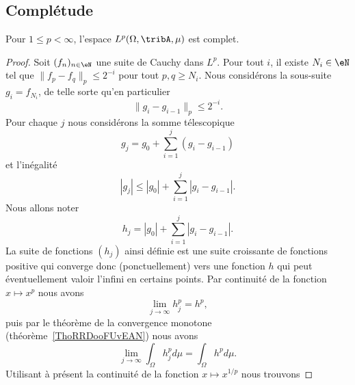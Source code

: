 \subsection{Complétude}

\begin{theorem}  \label{ThoUYBDWQX}
	Pour \( 1\leq p<\infty\), l'espace \( L^p(\Omega,\tribA,\mu)\) est complet.
\end{theorem}

\begin{proof}
	Soit \( (f_n)_{n\in\eN}\) une suite de Cauchy dans \( L^p\). Pour tout \( i\), il existe \( N_i\in\eN\) tel que $\| f_p-f_q \|_p\leq 2^{-i}$ pour tout \( p,q\geq N_i\). Nous considérons la sous-suite \( g_i=f_{N_i}\), de telle sorte qu'en particulier
	\begin{equation}    \label{EqJLoDID}
		\|g_i-g_{i-1}\|_p\leq 2^{-i}.
	\end{equation}
	Pour chaque \( j\) nous considérons la somme télescopique
	\begin{equation}
		g_j=g_0+\sum_{i=1}^j(g_i-g_{i-1})
	\end{equation}
	et l'inégalité
	\begin{equation}
		| g_j |\leq | g_0 |+\sum_{i=1}^j| g_i-g_{i-1} |.
	\end{equation}
	Nous allons noter
	\begin{equation}        \label{EqSomPaFPQOWC}
		h_j=| g_0 |+\sum_{i=1}^j| g_i-g_{i-1} |.
	\end{equation}
	La suite de fonctions \( (h_j)\) ainsi définie est une suite croissante de fonctions positive qui converge donc (ponctuellement) vers une fonction \( h\) qui peut éventuellement valoir l'infini en certains points. Par continuité de la fonction \( x\mapsto x^p\) nous avons
	\begin{equation}
		\lim_{j\to \infty} h_j^p=h^p,
	\end{equation}
	puis par le théorème de la convergence monotone (théorème~\ref{ThoRRDooFUvEAN}) nous avons
	\begin{equation}
		\lim_{j\to \infty} \int_{\Omega}h_j^pd\mu=\int_{\Omega}h^pd\mu.
	\end{equation}
	Utilisant à présent la continuité de la fonction \( x\mapsto x^{1/p}\) nous trouvons

\end{proof}
